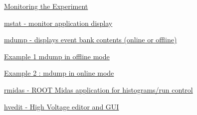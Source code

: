 \begin{TabularC}{2}
\begin{TabularC}{2}
\begin{DoxyItemize}
\item \hyperlink{RC_Monitor}{Monitoring the Experiment} 
\begin{DoxyItemize}
\item \hyperlink{RC_Monitor_RC_mstat_utility}{mstat -\/ monitor application display} 
\item \hyperlink{RC_Monitor_RC_mdump_utility}{mdump -\/ displays event bank contents (online or offline)} 
\begin{DoxyItemize}
\item \hyperlink{RC_Monitor_RC_mdump_ex1}{Example 1 mdump in offline mode} 
\item \hyperlink{RC_Monitor_RC_mdump_ex2}{Example 2 : mdump in online mode} 
\end{DoxyItemize}
\item \hyperlink{RC_Monitor_RC_rmidas_utility}{rmidas -\/ ROOT Midas application for histograms/run control} 
\item \hyperlink{RC_Monitor_RC_hvedit_utility}{hvedit -\/ High Voltage editor and GUI} 
\end{DoxyItemize}\par
 

\end{DoxyItemize}
\end{TabularC}
\end{TabularC}
